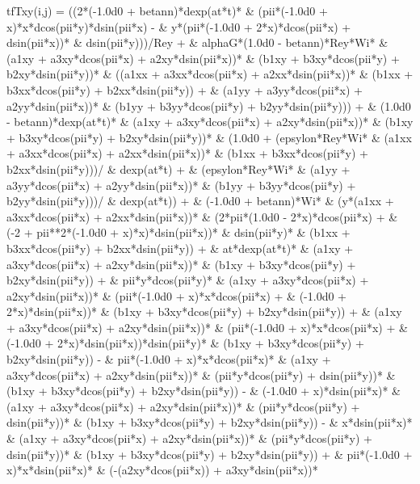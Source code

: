 \begin{fortrancode}[caption={Termos fontes}, label={cod:fortran-diffeq_2}]
       tfTxy(i,j) = ((2*(-1.0d0 + betann)*dexp(at*t)*
     &    (pii*(-1.0d0 + x)*x*dcos(pii*y)*dsin(pii*x) - 
     &      y*(pii*(-1.0d0 + 2*x)*dcos(pii*x) + dsin(pii*x))*
     &       dsin(pii*y)))/Rey + 
     & alphaG*(1.0d0 - betann)*Rey*Wi*
     &  (a1xy + a3xy*dcos(pii*x) + a2xy*dsin(pii*x))*
     &  (b1xy + b3xy*dcos(pii*y) + b2xy*dsin(pii*y))*
     &  ((a1xx + a3xx*dcos(pii*x) + a2xx*dsin(pii*x))*
     &     (b1xx + b3xx*dcos(pii*y) + b2xx*dsin(pii*y)) + 
     &    (a1yy + a3yy*dcos(pii*x) + a2yy*dsin(pii*x))*
     &     (b1yy + b3yy*dcos(pii*y) + b2yy*dsin(pii*y))) + 
     & (1.0d0 - betann)*dexp(at*t)*
     &  (a1xy + a3xy*dcos(pii*x) + a2xy*dsin(pii*x))*
     &  (b1xy + b3xy*dcos(pii*y) + b2xy*dsin(pii*y))*
     &  (1.0d0 + (epsylon*Rey*Wi*
     &       (a1xx + a3xx*dcos(pii*x) + a2xx*dsin(pii*x))*
     &       (b1xx + b3xx*dcos(pii*y) + b2xx*dsin(pii*y)))/
     &     dexp(at*t) + 
     &    (epsylon*Rey*Wi*
     &       (a1yy + a3yy*dcos(pii*x) + a2yy*dsin(pii*x))*
     &       (b1yy + b3yy*dcos(pii*y) + b2yy*dsin(pii*y)))/
     &     dexp(at*t)) + 
     & (-1.0d0 + betann)*Wi*
     &  (y*(a1xx + a3xx*dcos(pii*x) + a2xx*dsin(pii*x))*
     &     (2*pii*(1.0d0 - 2*x)*dcos(pii*x) + 
     &       (-2 + pii**2*(-1.0d0 + x)*x)*dsin(pii*x))*
     &     dsin(pii*y)*
     &     (b1xx + b3xx*dcos(pii*y) + b2xx*dsin(pii*y)) + 
     &    at*dexp(at*t)*
     &     (a1xy + a3xy*dcos(pii*x) + a2xy*dsin(pii*x))*
     &     (b1xy + b3xy*dcos(pii*y) + b2xy*dsin(pii*y)) + 
     &    pii*y*dcos(pii*y)*
     &     (a1xy + a3xy*dcos(pii*x) + a2xy*dsin(pii*x))*
     &     (pii*(-1.0d0 + x)*x*dcos(pii*x) + 
     &       (-1.0d0 + 2*x)*dsin(pii*x))*
     &     (b1xy + b3xy*dcos(pii*y) + b2xy*dsin(pii*y)) + 
     &    (a1xy + a3xy*dcos(pii*x) + a2xy*dsin(pii*x))*
     &     (pii*(-1.0d0 + x)*x*dcos(pii*x) + 
     &       (-1.0d0 + 2*x)*dsin(pii*x))*dsin(pii*y)*
     &     (b1xy + b3xy*dcos(pii*y) + b2xy*dsin(pii*y)) - 
     &    pii*(-1.0d0 + x)*x*dcos(pii*x)*
     &     (a1xy + a3xy*dcos(pii*x) + a2xy*dsin(pii*x))*
     &     (pii*y*dcos(pii*y) + dsin(pii*y))*
     &     (b1xy + b3xy*dcos(pii*y) + b2xy*dsin(pii*y)) - 
     &    (-1.0d0 + x)*dsin(pii*x)*
     &     (a1xy + a3xy*dcos(pii*x) + a2xy*dsin(pii*x))*
     &     (pii*y*dcos(pii*y) + dsin(pii*y))*
     &     (b1xy + b3xy*dcos(pii*y) + b2xy*dsin(pii*y)) - 
     &    x*dsin(pii*x)*
     &     (a1xy + a3xy*dcos(pii*x) + a2xy*dsin(pii*x))*
     &     (pii*y*dcos(pii*y) + dsin(pii*y))*
     &     (b1xy + b3xy*dcos(pii*y) + b2xy*dsin(pii*y)) + 
     &    pii*(-1.0d0 + x)*x*dsin(pii*x)*
     &     (-(a2xy*dcos(pii*x)) + a3xy*dsin(pii*x))*

\end{fortrancode}
